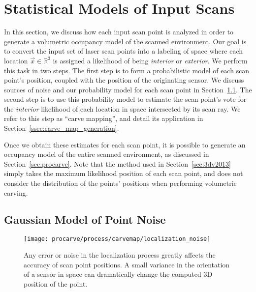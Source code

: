 \documentclass[12pt,onecolumn,oneside]{book}
\begin{document}
\section{Statistical Models of Input Scans}
\label{sec:fss_stats}


In this section, we discuss how each input scan point is analyzed in order to generate a volumetric occupancy model of the scanned environment.  Our goal is to convert the input set of laser scan points into a labeling of space where each location $\vec{x} \in \mathbb{R}^3$ is assigned a likelihood of being {\it interior} or {\it exterior}.  We perform this task in two steps.  The first step is to form a probabilistic model of each scan point's position, coupled with the position of the originating sensor.  We discuss sources of noise and our probability model for each scan point in Section~\ref{ssec:point_noise_sources}.  The second step is to use this probability model to estimate the scan point's vote for the {\it interior} likelihood of each location in space intersected by its scan ray.  We refer to this step as ``carve mapping'', and detail its application in Section~\ref{ssec:carve_map_generation}.  

Once we obtain these estimates for each scan point, it is possible to generate an occupancy model of the entire scanned environment, as discussed in Section~\ref{sec:procarve}.  Note that the method used in Section~\ref{sec:3dv2013} simply takes the maximum likelihood position of each scan point, and does not consider the distribution of the points' positions when performing volumetric carving.

\subsection{Gaussian Model of Point Noise}
\label{ssec:point_noise_sources}

\begin{figure}[t]
	\centerline{\texttt{[image: procarve/process/carvemap/localization\_noise]}}
	
	\caption[Example of localization noise affecting point accuracy.]{Any error or noise in the localization process greatly affects the accuracy of scan point positions.  A small variance in the orientation of a sensor in space can dramatically change the computed 3D position of the point.}
	\label{fig:localization_noise}
\end{figure}
\end{document}
